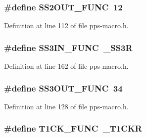 \subsubsection[{S\+S2\+O\+U\+T\+\_\+\+F\+U\+N\+C}]{\setlength{\rightskip}{0pt plus 5cm}\#define S\+S2\+O\+U\+T\+\_\+\+F\+U\+N\+C~12}\label{pps-macro_8h_a91f2d7ca98c64d374650418de37a2c80}


Definition at line 112 of file pps-\/macro.\+h.

\hypertarget{pps-macro_8h_afe34b1479faba1e8ff507b4f0dce1c68}{}
\subsubsection[{S\+S3\+I\+N\+\_\+\+F\+U\+N\+C}]{\setlength{\rightskip}{0pt plus 5cm}\#define S\+S3\+I\+N\+\_\+\+F\+U\+N\+C~\+\_\+\+S\+S3\+R}\label{pps-macro_8h_afe34b1479faba1e8ff507b4f0dce1c68}


Definition at line 162 of file pps-\/macro.\+h.

\hypertarget{pps-macro_8h_a5efd13ee0920fcb7e308d91d6ef218c9}{}
\subsubsection[{S\+S3\+O\+U\+T\+\_\+\+F\+U\+N\+C}]{\setlength{\rightskip}{0pt plus 5cm}\#define S\+S3\+O\+U\+T\+\_\+\+F\+U\+N\+C~34}\label{pps-macro_8h_a5efd13ee0920fcb7e308d91d6ef218c9}


Definition at line 128 of file pps-\/macro.\+h.

\hypertarget{pps-macro_8h_a794a87354daa554bcd4c22e381582fde}{}
\subsubsection[{T1\+C\+K\+\_\+\+F\+U\+N\+C}]{\setlength{\rightskip}{0pt plus 5cm}\#define T1\+C\+K\+\_\+\+F\+U\+N\+C~\+\_\+\+T1\+C\+K\+R}\label{pps-macro_8h_a794a87354daa554bcd4c22e381582fde}


